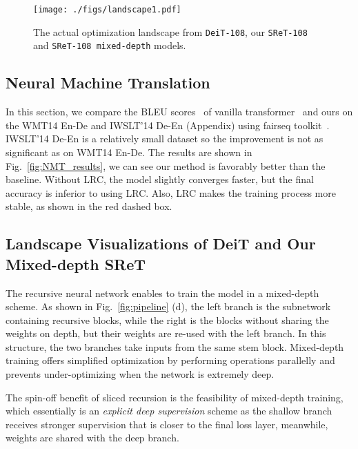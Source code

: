 \documentclass[runningheads]{llncs}
\begin{document}
	\begin{figure}[b]
        \centering \vspace{-0.2in}
		\texttt{[image: ./figs/landscape1.pdf]}\vspace{-0.12in}
		\caption{The actual optimization landscape from \texttt{DeiT-108}, our \texttt{SReT-108} and \texttt{SReT-108 mixed-depth} models.}
		\label{fig:landscape_actual}
	\end{figure}
	
	\subsection{Neural Machine Translation}\label{machine_translation}
	
	In this section, we compare the BLEU scores~\cite{papineni-etal-2002-bleu} of vanilla transformer~\cite{vaswani2017attention} and ours on the WMT14 En-De and IWSLT'14 De-En (Appendix) using fairseq toolkit~\cite{fair_sque}. IWSLT'14 De-En is a relatively small dataset so the improvement is not as significant as on WMT14 En-De. The results are shown in Fig.~\ref{fig:NMT_results}, we can see our method is favorably better than the baseline. Without LRC, the model slightly converges faster, but the final accuracy is inferior to using LRC. Also, LRC makes the training process more stable, as shown in the red dashed box.
	
	\subsection{Landscape Visualizations of DeiT and Our Mixed-depth SReT} \label{landscape}
	 The recursive neural network enables to train the model in a mixed-depth scheme. As shown in Fig.~\ref{fig:pipeline} (d), the left branch is the subnetwork containing recursive blocks, while the right is the blocks without sharing the weights on depth, but their weights are re-used with the left branch. In this structure, the two branches take inputs from the same stem block. Mixed-depth training offers simplified optimization by performing operations parallelly and prevents under-optimizing when the network is extremely deep.
	
	 The spin-off benefit of sliced recursion is the feasibility of mixed-depth training, which essentially is an {\em explicit deep supervision} scheme as the shallow branch receives stronger supervision that is closer to the final loss layer, meanwhile, weights are shared with the deep branch. 
	
\end{document}
